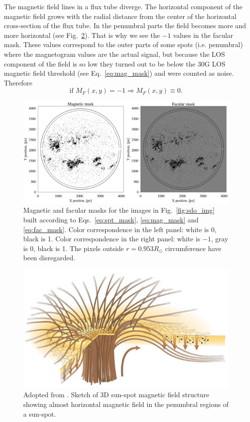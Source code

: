 \documentclass[paper=a4, fontsize=11pt]{article}
\numberwithin{equation}{section}
\numberwithin{figure}{section}
\numberwithin{table}{section}
\begin{document}
The magnetic field lines in a flux tube diverge.
The horizontal component of the magnetic field grows with
the radial distance from the center of the horizontal cross-section of the flux tube.
In the penumbral parts the field becomes more and more horizontal (see Fig.~\ref{fig:3D_spot}).
That is why we see the $-1$ values in the facular mask.
These values correspond to the outer parts of some spots (i.e. penumbral) 
where the magnetogram values are the actual signal, but
because the LOS component of the field is so low they turned out to be below the 30G LOS magnetic
field threshold (see Eq.~\ref{eq:mag_mask}) and were counted as noise.
Therefore
\begin{equation}
\mbox{if } M_F(x, y) = -1 \Rightarrow M_F(x, y)\equiv 0.
\end{equation}
\begin{figure}[h!]
\centering
\includegraphics[scale=0.375]{mag_fac_mask}
\caption[]{Magnetic and facular masks for the images in Fig.~\ref{fig:sdo_img} built
           according to Eqs.~\eqref{eq:spt_mask}, \eqref{eq:mag_mask} and \eqref{eq:fac_mask}.
           Color correspondence in the left panel:  white is 0, black is 1.
           Color correspondence in the right panel: white is $-1$, gray is 0, black is 1.
           The pixels outside $r = 0.953R_\odot$ circumference have been disregarded.}
\label{fig:mag_fac_mask}
\end{figure}
\begin{figure}[h!]
\centering
\includegraphics[scale=0.575]{3D_spot}
\caption[]{Adopted from \cite{thomas2002}. Sketch of 3D sun-spot magnetic field structure showing almost horizontal
           magnetic field in the penumbral regions of a sun-spot.}
\label{fig:3D_spot}
\end{figure}
\end{document}
